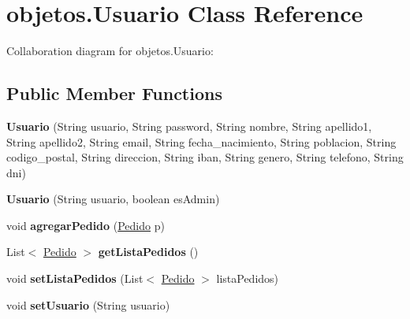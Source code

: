 \hypertarget{classobjetos_1_1_usuario}{}\section{objetos.\+Usuario Class Reference}
\label{classobjetos_1_1_usuario}


Collaboration diagram for objetos.\+Usuario\+:
\subsection*{Public Member Functions}
\begin{DoxyCompactItemize}
\item 
\mbox{\label{classobjetos_1_1_usuario_a0d13573d3c808402df18a489ecb81654}} 
{\bfseries Usuario} (String usuario, String password, String nombre, String apellido1, String apellido2, String email, String fecha\+\_\+nacimiento, String poblacion, String codigo\+\_\+postal, String direccion, String iban, String genero, String telefono, String dni)
\item 
\mbox{\label{classobjetos_1_1_usuario_aa3a7114995ef02ed515c668148eb2aca}} 
{\bfseries Usuario} (String usuario, boolean es\+Admin)
\item 
\mbox{\label{classobjetos_1_1_usuario_a1d3a6e897c852226d1b419c67089ec3b}} 
void {\bfseries agregar\+Pedido} (\mbox{\hyperlink{classobjetos_1_1_pedido}{Pedido}} p)
\item 
\mbox{\label{classobjetos_1_1_usuario_af3fd03fa3c7765c9005a75d70256288e}} 
List$<$ \mbox{\hyperlink{classobjetos_1_1_pedido}{Pedido}} $>$ {\bfseries get\+Lista\+Pedidos} ()
\item 
\mbox{\label{classobjetos_1_1_usuario_ab7bc0d18ecfee488dcf322094629ef5d}} 
void {\bfseries set\+Lista\+Pedidos} (List$<$ \mbox{\hyperlink{classobjetos_1_1_pedido}{Pedido}} $>$ lista\+Pedidos)
\item 
\mbox{\label{classobjetos_1_1_usuario_a7be3dc8fe52e00029ec3a6ec763116e1}} 
void {\bfseries set\+Usuario} (String usuario)
\item 
\mbox{\label{classobjetos_1_1_usuario_acebc98a73bf17db1fb88e476e64f2c6c}} 

\end{DoxyCompactItemize}

